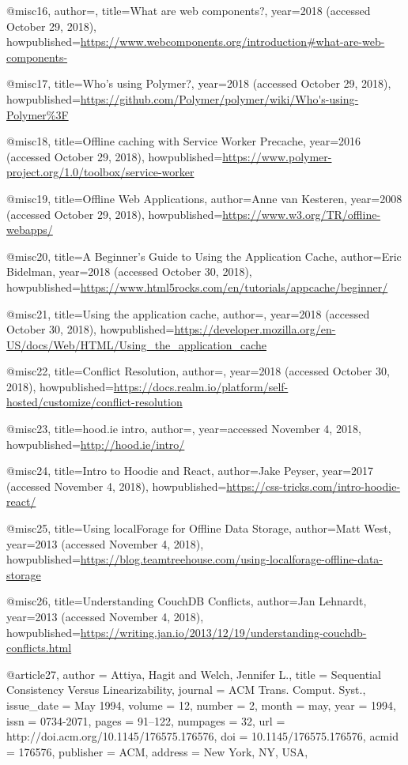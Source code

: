 @misc{16, 
author={},
title={What are web components?},
year={2018 (accessed October 29, 2018)},
howpublished={\url{https://www.webcomponents.org/introduction#what-are-web-components-}}
}

@misc{17,
title={Who's using Polymer?},
year={2018 (accessed October 29, 2018)},
howpublished={\url{https://github.com/Polymer/polymer/wiki/Who's-using-Polymer%3F}}
}

@misc{18,
title={Offline caching with Service Worker Precache},
year={2016 (accessed October 29, 2018)},
howpublished={\url{https://www.polymer-project.org/1.0/toolbox/service-worker}}
}

@misc{19,
title={Offline Web Applications},
author={Anne van Kesteren},
year={2008 (accessed October 29, 2018)},
howpublished={\url{https://www.w3.org/TR/offline-webapps/}}
}

@misc{20,
title={A Beginner's Guide to Using the Application Cache},
author={Eric Bidelman},
year={2018 (accessed October 30, 2018)},
howpublished={\url{https://www.html5rocks.com/en/tutorials/appcache/beginner/}}
}

@misc{21,
title={Using the application cache},
author={},
year={2018 (accessed October 30, 2018)},
howpublished={\url{https://developer.mozilla.org/en-US/docs/Web/HTML/Using_the_application_cache}}
}

@misc{22,
title={Conflict Resolution},
author={},
year={2018 (accessed October 30, 2018)},
howpublished={\url{https://docs.realm.io/platform/self-hosted/customize/conflict-resolution}}
}

@misc{23, 
title={hood.ie intro},
author={},
year={accessed November 4, 2018},
howpublished={\url{http://hood.ie/intro/}}
}

@misc{24,
title={Intro to Hoodie and React},
author={Jake Peyser},
year={2017 (accessed November 4, 2018)},
howpublished={\url{https://css-tricks.com/intro-hoodie-react/}}
}

@misc{25, 
title={Using localForage for Offline Data Storage},
author={Matt West},
year={2013 (accessed November 4, 2018)},
howpublished={\url{https://blog.teamtreehouse.com/using-localforage-offline-data-storage}}
}

@misc{26,
title={Understanding CouchDB Conflicts},
author={Jan Lehnardt},
year={2013 (accessed November 4, 2018)},
howpublished={\url{https://writing.jan.io/2013/12/19/understanding-couchdb-conflicts.html}}
}

@article{27,
 author = {Attiya, Hagit and Welch, Jennifer L.},
 title = {Sequential Consistency Versus Linearizability},
 journal = {ACM Trans. Comput. Syst.},
 issue_date = {May 1994},
 volume = {12},
 number = {2},
 month = may,
 year = {1994},
 issn = {0734-2071},
 pages = {91--122},
 numpages = {32},
 url = {http://doi.acm.org/10.1145/176575.176576},
 doi = {10.1145/176575.176576},
 acmid = {176576},
 publisher = {ACM},
 address = {New York, NY, USA},
} 
